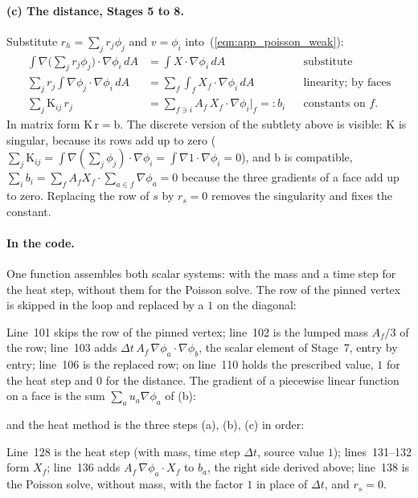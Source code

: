 \paragraph{(c) The distance, Stages 5 to 8.} Substitute $r_h = \sum_j r_j\phi_j$ and $v = \phi_i$ into~(\ref{eqn:app_poisson_weak}):
\begin{align*}
\int\nabla\Big(\sum_j r_j\phi_j\Big)\cdot\nabla\phi_i\, dA &= \int X\cdot\nabla\phi_i\, dA && \text{substitute} \\
\sum_j r_j\int\nabla\phi_j\cdot\nabla\phi_i\, dA &= \sum_f \int_f X_f\cdot\nabla\phi_i\, dA && \text{linearity; by faces} \\
\sum_j \mathrm K_{ij}\, r_j &= \sum_{f\ni i} A_f\, X_f\cdot\nabla\phi_i|_f =: b_i && \text{constants on } f .
\end{align*}
In matrix form $\mathrm K\,\mathrm r = \mathrm b$. The discrete version of the subtlety above is visible: $\mathrm K$ is singular, because its rows add up to zero ($\sum_j\mathrm K_{ij} = \int\nabla(\sum_j\phi_j)\cdot\nabla\phi_i = \int\nabla 1\cdot\nabla\phi_i = 0$), and $\mathrm b$ is compatible, $\sum_i b_i = \sum_f A_f X_f\cdot\sum_{a\in f}\nabla\phi_a = 0$ because the three gradients of a face add up to zero. Replacing the row of $s$ by $r_s = 0$ removes the singularity and fixes the constant.

\paragraph{In the code.} One function assembles both scalar systems: with the mass and a time step for the heat step, without them for the Poisson solve. The row of the pinned vertex is skipped in the loop and replaced by a $1$ on the diagonal:

Line~101 skips the row of the pinned vertex; line~102 is the lumped mass $A_f/3$ of the row; line~103 adds $\Delta t\, A_f\,\nabla\phi_a\cdot\nabla\phi_b$, the scalar element of Stage~7, entry by entry; line~106 is the replaced row;  on line~110 holds the prescribed value, $1$ for the heat step and $0$ for the distance. The gradient of a piecewise linear function on a face is the sum $\sum_a u_a\nabla\phi_a$ of (b):

and the heat method is the three steps (a), (b), (c) in order:

Line~128 is the heat step (with mass, time step $\Delta t$, source value $1$); lines~131--132 form $X_f$; line~136 adds $A_f\,\nabla\phi_a\cdot X_f$ to $b_a$, the right side derived above; line~138 is the Poisson solve, without mass, with the factor $1$ in place of $\Delta t$, and $r_s = 0$.

